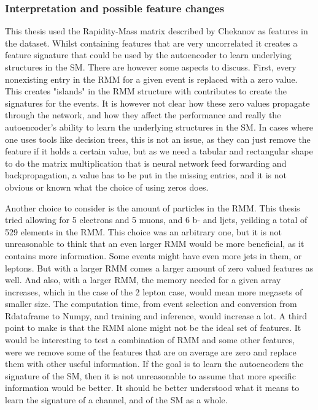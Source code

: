 \subsubsection*{Interpretation and possible feature changes}
This thesis used the Rapidity-Mass matrix described by Chekanov\cite{Chekanov_2019} as features in the dataset. 
Whilst containing features that are very uncorrelated it creates a feature signature that could be used by 
the autoencoder to learn underlying structures in the SM. There are however some aspects to discuss. 
First, every nonexisting entry in the RMM for a given event is replaced with a zero value. This creates 
"islands" in the RMM structure with contributes to create the signatures for the events. It is however not clear 
how these zero values propagate through the network, and how they affect the performance and really the autoencoder's 
ability to learn the underlying structures in the SM. In cases where one uses tools like decision trees, 
this is not an issue, as they can just remove the feature if it holds a certain value, but as we need a tabular and 
rectangular shape to do the matrix multiplication that is neural network feed forwarding and backpropagation, a value
has to be put in the missing entries, and it is not obvious or known what the choice of using zeros does. \par 
Another choice to consider is the amount of particles in the RMM. This thesis tried allowing for 5 electrons and 5 muons, 
and 6 b- and ljets, yeilding a total of 529 elements in the RMM. This choice was an arbitrary one, but it is not 
unreasonable to think that an even larger RMM would be more beneficial, as it contains more information. Some 
events might have even more jets in them, or leptons. But with a larger RMM comes a larger amount of zero valued 
features as well. And also, with a larger RMM, the memory needed for a given array increases, which in the case of
the 2 lepton case, would mean more megasets of smaller size. The computation time, from event selection and conversion from Rdataframe to Numpy, and training 
and inference, would increase a lot. A third point to make is that the RMM alone might not be the ideal set of features. 
It would be interesting to test a combination of RMM and some other features, were we remove some of the features that are
on average are zero and replace them with other useful information. If the goal is to learn the autoencoders the signature 
of the SM, then it is not unreasonable to assume that more specific information would be better. It should be better understood 
what it means to learn the signature of a channel, and of the SM as a whole. \par 





